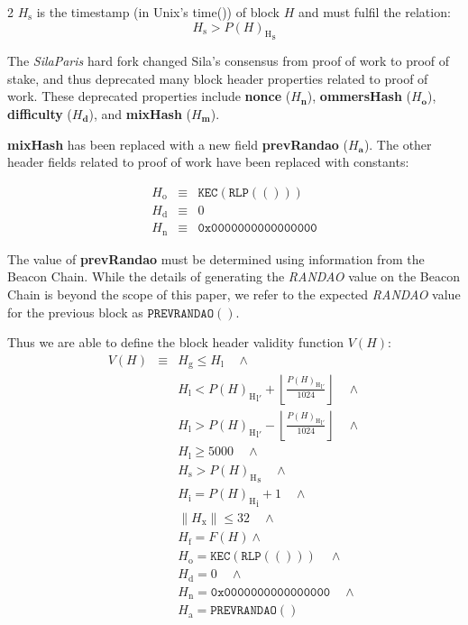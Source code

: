\documentclass[9pt,oneside]{amsart}
\begin{document}
\begin{multicols}{2}
\hypertarget{block_timestamp_H__s}{}$H_{\mathrm{s}}$ is the timestamp (in Unix's time()) of block $H$ and must fulfil the relation:
\begin{equation}
H_{\mathrm{s}} > {P(H)_{\mathrm{H}}}_{\mathrm{s}}
\end{equation}

The \textit{SilaParis} hard fork changed Sila's consensus from proof of work to proof of stake, and thus deprecated many block header properties related to proof of work. These deprecated properties include \textbf{nonce} ($H_{\mathbf{n}}$), \textbf{ommersHash} ($H_{\mathbf{o}}$), \textbf{difficulty} ($H_{\mathbf{d}}$), and \textbf{mixHash} ($H_{\mathbf{m}}$).

\textbf{mixHash} has been replaced with a new field \textbf{prevRandao} ($H_{\mathbf{a}}$). The other header fields related to proof of work have been replaced with constants:

\begin{eqnarray}
  H_{\mathrm{o}} & \equiv & \texttt{KEC}(\texttt{RLP}(())) \\
  H_{\mathrm{d}} & \equiv  & 0 \\
  H_{\mathrm{n}}  & \equiv & \texttt{0x0000000000000000}
\end{eqnarray}

The value of \textbf{prevRandao} must be determined using information from the Beacon Chain.
While the details of generating the \textit{RANDAO} value on the Beacon Chain is beyond the scope of this paper, we refer to the expected \textit{RANDAO} value for the previous block as $\mathtt{PREVRANDAO}()$.

\hypertarget{block_header_validity_function}{}Thus we are able to define the block header validity function $V(H)$:
\begin{eqnarray}
V(H) & \equiv & H_{\mathrm{g}} \le H_{\mathrm{l}}  \quad \wedge \\
\nonumber& & H_{\mathrm{l}} < {P(H)_{\mathrm{H}}}_{\mathrm{l}'} + \left\lfloor\frac{{P(H)_{\mathrm{H}}}_{\mathrm{l}'}}{1024}\right\rfloor  \quad \wedge \\
\nonumber& & H_{\mathrm{l}} > {P(H)_{\mathrm{H}}}_{\mathrm{l}'} - \left\lfloor\frac{{P(H)_{\mathrm{H}}}_{\mathrm{l}'}}{1024}\right\rfloor  \quad \wedge \\
\nonumber& & H_{\mathrm{l}} \geqslant 5000  \quad \wedge \\
\nonumber& & H_{\mathrm{s}} > {P(H)_{\mathrm{H}}}_{\mathrm{s}} \quad \wedge \\
\nonumber& & H_{\mathrm{i}} = {P(H)_{\mathrm{H}}}_{\mathrm{i}} +1 \quad \wedge \\
\nonumber& & \lVert H_{\mathrm{x}} \rVert \le 32 \quad \wedge \\
\nonumber& & H_{\mathrm{f}} = F(H) \wedge \\
\nonumber& & H_{\mathrm{o}} = \texttt{KEC}(\texttt{RLP}(())) \quad \wedge \\
\nonumber& & H_{\mathrm{d}} = 0 \quad \wedge \\
\nonumber& & H_{\mathrm{n}} = \texttt{0x0000000000000000} \quad \wedge \\
\nonumber& & H_{\mathrm{a}} = \mathtt{PREVRANDAO}()
\end{eqnarray}


\end{multicols}
\end{document}
